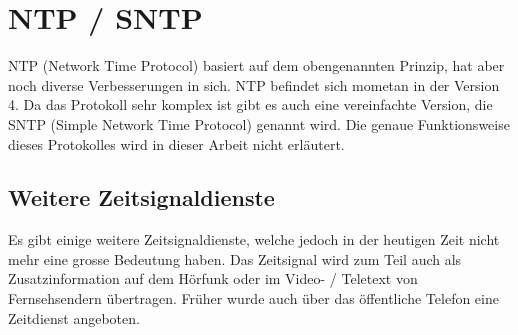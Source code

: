 

\section{NTP / SNTP}
NTP (Network Time Protocol) basiert auf dem obengenannten Prinzip, hat aber noch diverse Verbesserungen in sich.
NTP befindet sich mometan in der Version 4.
Da das Protokoll sehr komplex ist gibt es auch eine vereinfachte Version, die SNTP (Simple Network Time Protocol) genannt wird.
Die genaue Funktionsweise dieses Protokolles wird in dieser Arbeit nicht erläutert.



\subsection{Weitere Zeitsignaldienste}
Es gibt einige weitere Zeitsignaldienste, welche jedoch in der heutigen Zeit nicht mehr eine grosse Bedeutung haben. Das Zeitsignal wird zum Teil auch als Zusatzinformation auf dem Hörfunk oder im Video- / Teletext von Fernsehsendern übertragen. Früher wurde auch über das öffentliche Telefon eine Zeitdienst angeboten.



